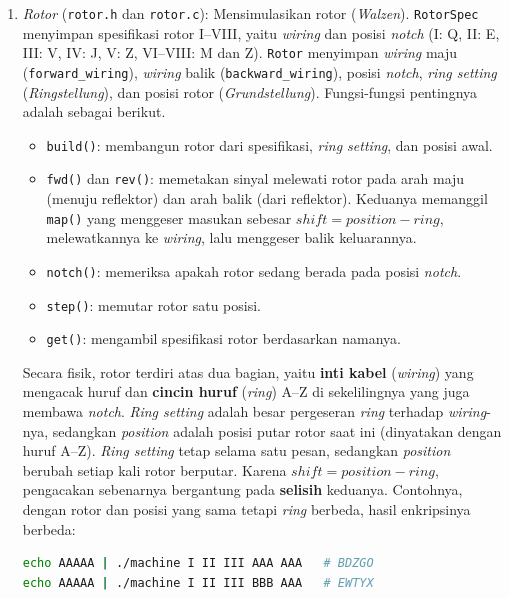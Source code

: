 \begin{enumerate}
  \item \textit{Rotor} (\texttt{rotor.h} dan \texttt{rotor.c}): Mensimulasikan rotor (\textit{Walzen}).
  \texttt{RotorSpec} menyimpan spesifikasi rotor I--VIII, yaitu \textit{wiring} dan posisi \textit{notch}
  (I: Q, II: E, III: V, IV: J, V: Z, VI--VIII: M dan Z). \texttt{Rotor} menyimpan \textit{wiring} maju
  (\texttt{forward\_wiring}), \textit{wiring} balik (\texttt{backward\_wiring}), posisi \textit{notch},
  \textit{ring setting} (\textit{Ringstellung}), dan posisi rotor (\textit{Grundstellung}). Fungsi-fungsi
  pentingnya adalah sebagai berikut.
  \begin{itemize}[nosep]
    \item \texttt{build()}: membangun rotor dari spesifikasi, \textit{ring setting}, dan posisi awal.
    \item \texttt{fwd()} dan \texttt{rev()}: memetakan sinyal melewati rotor pada arah maju (menuju
    reflektor) dan arah balik (dari reflektor). Keduanya memanggil \texttt{map()} yang menggeser masukan
    sebesar $\mathit{shift} = \mathit{position} - \mathit{ring}$, melewatkannya ke \textit{wiring}, lalu
    menggeser balik keluarannya.
    \item \texttt{notch()}: memeriksa apakah rotor sedang berada pada posisi \textit{notch}.
    \item \texttt{step()}: memutar rotor satu posisi.
    \item \texttt{get()}: mengambil spesifikasi rotor berdasarkan namanya.
  \end{itemize}

  Secara fisik, rotor terdiri atas dua bagian, yaitu \textbf{inti kabel} (\textit{wiring}) yang mengacak
  huruf dan \textbf{cincin huruf} (\textit{ring}) A--Z di sekelilingnya yang juga membawa \textit{notch}.
  \textit{Ring setting} adalah besar pergeseran \textit{ring} terhadap \textit{wiring}-nya, sedangkan
  \textit{position} adalah posisi putar rotor saat ini (dinyatakan dengan huruf A--Z). \textit{Ring setting} tetap selama satu
  pesan, sedangkan \textit{position} berubah setiap kali rotor berputar. Karena
  $\mathit{shift} = \mathit{position} - \mathit{ring}$, pengacakan sebenarnya bergantung pada
  \textbf{selisih} keduanya. Contohnya, dengan rotor dan posisi yang sama tetapi \textit{ring} berbeda,
  hasil enkripsinya berbeda:
\begin{lstlisting}[language=bash,numbers=none]
echo AAAAA | ./machine I II III AAA AAA   # BDZGO
echo AAAAA | ./machine I II III BBB AAA   # EWTYX
\end{lstlisting}


\end{enumerate}
